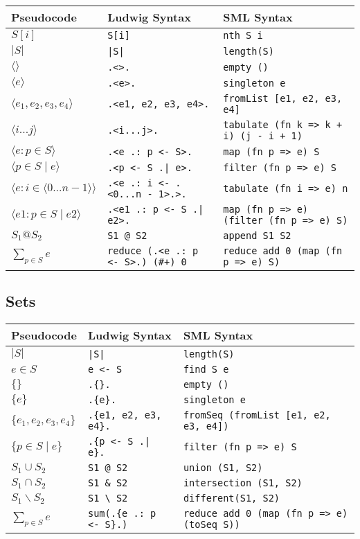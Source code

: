 \documentclass[11pt]{article}
\begin{document}
\begin{tabular}{| l l l |}
\hline
\textbf{Pseudocode} & \textbf{Ludwig Syntax} & \textbf{SML Syntax}\\
\hline
$S[i]$ & \verb"S[i]" & \verb"nth S i"\\
$|S|$ & \verb"|S|" & \verb"length(S)"\\
$\langle \rangle$ & \verb".<>." & \verb"empty ()"\\
$\langle e \rangle$ & \verb".<e>." & \verb"singleton e"\\
$\langle e_1, e_2, e_3, e_4 \rangle$ & \verb".<e1, e2, e3, e4>." & \verb"fromList [e1, e2, e3, e4]"\\
$\langle i...j \rangle$ & \verb".<i...j>." & \verb"tabulate (fn k => k + i) (j - i + 1)"\\
$\langle e : p \in S \rangle$ & \verb".<e .: p <- S>." & \verb"map (fn p => e) S"\\
$\langle p \in S \mid e \rangle$ & \verb".<p <- S .| e>." & \verb"filter (fn p => e) S"\\
$\langle e : i \in \langle 0...n - 1 \rangle \rangle$ & \verb".<e .: i <- .<0...n - 1>.>." & \verb"tabulate (fn i => e) n"\\
$\langle e1 : p \in S \mid e2 \rangle$ & \verb".<e1 .: p <- S .| e2>." & \verb"map (fn p => e) (filter (fn p => e) S)"\\
$S_1 @ S_2$ & \verb"S1 @ S2" & \verb"append S1 S2"\\
$\displaystyle \sum_{p \in S}{e}$ & \verb"reduce (.<e .: p <- S>.) (#+) 0" & \verb"reduce add 0 (map (fn p => e) S)"\\
\hline
\end{tabular}

\subsection{Sets}

\begin{tabular}{| l l l |}
\hline
\textbf{Pseudocode} & \textbf{Ludwig Syntax} & \textbf{SML Syntax}\\
\hline
$|S|$ & \verb"|S|" & \verb"length(S)"\\
$e \in S$ & \verb"e <- S" & \verb"find S e"\\
$\{\}$ & \verb".{}." & \verb"empty ()"\\
$\{e\}$ & \verb".{e}." & \verb"singleton e"\\
$\{e_1, e_2, e_3, e_4\}$ & \verb".{e1, e2, e3, e4}." & \verb"fromSeq (fromList [e1, e2, e3, e4])"\\
$\{p \in S \mid e\}$ & \verb".{p <- S .| e}." & \verb"filter (fn p => e) S"\\
$S_1 \cup S_2$ & \verb"S1 @ S2" & \verb"union (S1, S2)"\\
$S_1 \cap S_2$ & \verb"S1 & S2" & \verb"intersection (S1, S2)"\\
$S_1 \backslash S_2$ & \verb"S1 \ S2" & \verb"different(S1, S2)"\\
$\displaystyle \sum_{p \in S}{e}$ & \verb"sum(.{e .: p <- S}.)" & \verb"reduce add 0 (map (fn p => e) (toSeq S))"\\
\hline
\end{tabular}
\end{document}

